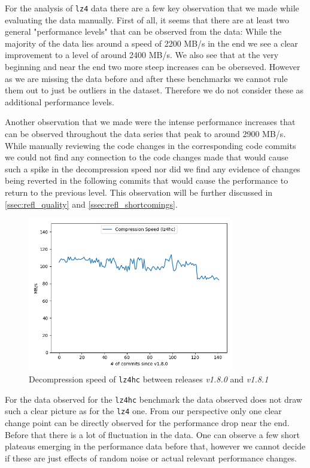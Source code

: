 \documentclass[	runningheads,
				a4paper]{llncs}
\begin{document}
For the analysis of \texttt{lz4} data there are a few key observation that we made while evaluating the data manually. First of all, it seems that there are at least two general "performance levels" that can be observed from the data: While the majority of the data lies around a speed of 2200 MB/s in the end we see a clear improvement to a level of around 2400 MB/s. We also see that at the very beginning and near the end two more steep increases can be oberseved. However as we are missing the data before and after these benchmarks we cannot rule them out to just be outliers in the dataset. Therefore we do not consider these as additional performance levels.

Another observation that we made were the intense performance increases that can be observed throughout the data series that peak to around 2900 MB/s. While manually reviewing the code changes in the corresponding code commits we could not find any connection to the code changes made that would cause such a spike in the decompression speed nor did we find any evidence of changes being reverted in the following commits that would cause the performance to return to the previous level. This observation will be further discussed in \autoref{ssec:refl_quality} and \autoref{ssec:refl_shortcomings}.

\begin{figure}[ht!]
	\centering
	\includegraphics[width=0.8\textwidth]{graph/lz4hc_commits_compression}
	\caption{Decompression speed of \texttt{lz4hc} between releases \textit{v1.8.0} and \textit{v1.8.1}}
	\label{fig:lz4hc_commit_bench}
\end{figure}

For the data observed for the \texttt{lz4hc} benchmark the data observed does not draw such a clear picture as for the \texttt{lz4} one. From our perspective only one clear change point can be directly observed for the performance drop near the end. Before that there is a lot of fluctuation in the data. One can observe a few short plateaus emerging in the performance data before that, however we cannot decide if these are just effects of random noise or actual relevant performance changes.
\end{document}
